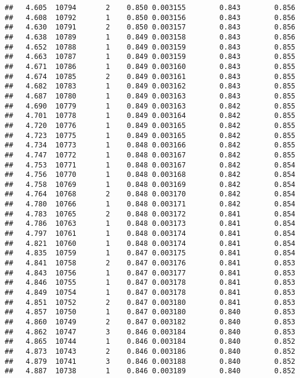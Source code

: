 \documentclass[
]{book}
\begin{document}
\begin{verbatim}
##   4.605  10794       2    0.850 0.003155        0.843        0.856
##   4.608  10792       1    0.850 0.003156        0.843        0.856
##   4.630  10791       2    0.850 0.003157        0.843        0.856
##   4.638  10789       1    0.849 0.003158        0.843        0.856
##   4.652  10788       1    0.849 0.003159        0.843        0.855
##   4.663  10787       1    0.849 0.003159        0.843        0.855
##   4.671  10786       1    0.849 0.003160        0.843        0.855
##   4.674  10785       2    0.849 0.003161        0.843        0.855
##   4.682  10783       1    0.849 0.003162        0.843        0.855
##   4.687  10780       1    0.849 0.003163        0.843        0.855
##   4.690  10779       1    0.849 0.003163        0.842        0.855
##   4.701  10778       1    0.849 0.003164        0.842        0.855
##   4.720  10776       1    0.849 0.003165        0.842        0.855
##   4.723  10775       1    0.849 0.003165        0.842        0.855
##   4.734  10773       1    0.848 0.003166        0.842        0.855
##   4.747  10772       1    0.848 0.003167        0.842        0.855
##   4.753  10771       1    0.848 0.003167        0.842        0.854
##   4.756  10770       1    0.848 0.003168        0.842        0.854
##   4.758  10769       1    0.848 0.003169        0.842        0.854
##   4.764  10768       2    0.848 0.003170        0.842        0.854
##   4.780  10766       1    0.848 0.003171        0.842        0.854
##   4.783  10765       2    0.848 0.003172        0.841        0.854
##   4.786  10763       1    0.848 0.003173        0.841        0.854
##   4.797  10761       1    0.848 0.003174        0.841        0.854
##   4.821  10760       1    0.848 0.003174        0.841        0.854
##   4.835  10759       1    0.847 0.003175        0.841        0.854
##   4.841  10758       2    0.847 0.003176        0.841        0.853
##   4.843  10756       1    0.847 0.003177        0.841        0.853
##   4.846  10755       1    0.847 0.003178        0.841        0.853
##   4.849  10754       1    0.847 0.003178        0.841        0.853
##   4.851  10752       2    0.847 0.003180        0.841        0.853
##   4.857  10750       1    0.847 0.003180        0.840        0.853
##   4.860  10749       2    0.847 0.003182        0.840        0.853
##   4.862  10747       3    0.846 0.003184        0.840        0.853
##   4.865  10744       1    0.846 0.003184        0.840        0.852
##   4.873  10743       2    0.846 0.003186        0.840        0.852
##   4.879  10741       3    0.846 0.003188        0.840        0.852
##   4.887  10738       1    0.846 0.003189        0.840        0.852

\end{verbatim}
\end{document}
